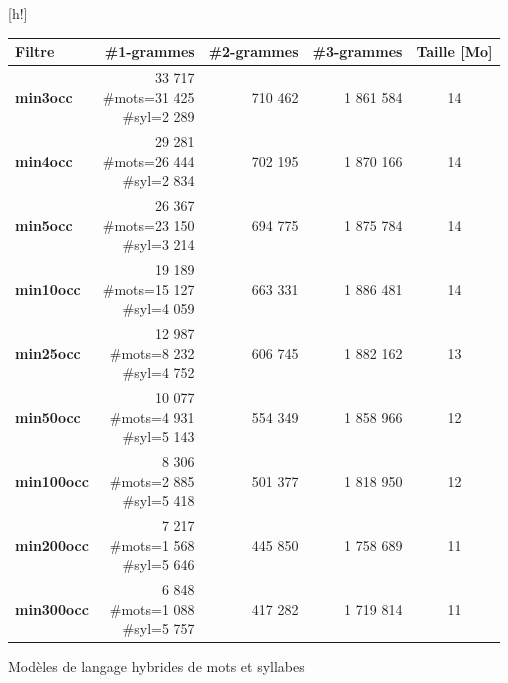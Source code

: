 \documentclass{style/these}
\makeatletter
\renewcommand\familydefault{ptm}
\newenvironment{aTable}%
  {%
   \renewcommand{\familydefault}{lmtt}\selectfont
  \@float{table}}
  {\end@float}
\newcommand{\specialcell}[2][r]{%
  \begin{tabular}[#1]{@{}r@{}}#2\end{tabular}}
\makeatother
\begin{document}
\begin{part}
\begin{aTable}[h!]
\centering
\begin{tabular}{|L{3cm}|r|r|r|c|}
\hline
\textbf{Filtre} 	& \textbf{\#1-grammes} & \textbf{\#2-grammes} & \textbf{\#3-grammes}& \textbf{Taille [Mo]}      \\ \hline
\textbf{min3occ}	& \specialcell{33 717\\\#mots=31 425\\\#syl=2 289}	& 710 462	& 1 861 584	&  14 \\ \hline
\textbf{min4occ}	& \specialcell{29 281\\\#mots=26 444\\\#syl=2 834}	& 702 195	& 1 870 166	&  14 \\ \hline
\textbf{min5occ}	& \specialcell{26 367\\\#mots=23 150\\\#syl=3 214}	& 694 775	& 1 875 784	&  14 \\ \hline
\textbf{min10occ}	& \specialcell{19 189\\\#mots=15 127\\\#syl=4 059}	& 663 331	& 1 886 481	&  14 \\ \hline
\textbf{min25occ}	& \specialcell{12 987\\\#mots=8 232\\\#syl=4 752}	& 606 745	& 1 882 162	&  13 \\ \hline
\textbf{min50occ}	& \specialcell{10 077\\\#mots=4 931\\\#syl=5 143}	& 554 349	& 1 858 966	&  12 \\ \hline
\textbf{min100occ}	& \specialcell{ 8 306\\\#mots=2 885\\\#syl=5 418}	& 501 377	& 1 818 950	&  12 \\ \hline
\textbf{min200occ}	& \specialcell{ 7 217\\\#mots=1 568\\\#syl=5 646}	& 445 850	& 1 758 689	&  11 \\ \hline
\textbf{min300occ}	& \specialcell{ 6 848\\\#mots=1 088\\\#syl=5 757}	& 417 282	& 1 719 814	&  11 \\ \hline
\end{tabular}
\caption{Modèles de langage hybrides de mots et syllabes}
\label{Tab:LMs_H}
\end{aTable}


\newpage


\end{part}
\end{document}

